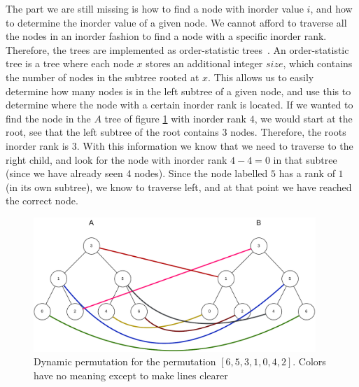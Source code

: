 The part we are still missing is how to find a node with inorder value $i$, and how to
determine the inorder value of a given node. We cannot afford to traverse all the nodes in
an inorder fashion to find a node with a specific inorder rank. Therefore, the trees are
implemented as order-statistic trees~\cite[340]{CLRS}. An order-statistic tree is a tree
where each node $x$ stores an additional integer $size$, which contains the number of
nodes in the subtree rooted at $x$. This allows us to easily determine how many nodes is
in the left subtree of a given node, and use this to determine where the node with a
certain inorder rank is located. If we wanted to find the node in the $A$ tree of figure
\ref{fig:dynamicpermutation} with inorder rank $4$, we would start at the root, see that
the left subtree of the root contains $3$ nodes. Therefore, the roots inorder rank is $3$.
With this information we know that we need to traverse to the right child, and look for
the node with inorder rank $4 - 4 = 0$ in that subtree (since we have already seen 4
nodes). Since the node labelled $5$ has a rank of $1$ (in its own subtree), we know to
traverse left, and at that point we have reached the correct node.

\begin{figure}[t]
	\begin{center}
		\includegraphics[width=0.95\textwidth]{figures/dynamicpermutation.drawio.pdf}
	\end{center}
	\caption{Dynamic permutation for the permutation $[6,5,3,1,0,4,2]$. Colors have no meaning except to make lines clearer}
	\label{fig:dynamicpermutation}
\end{figure}


